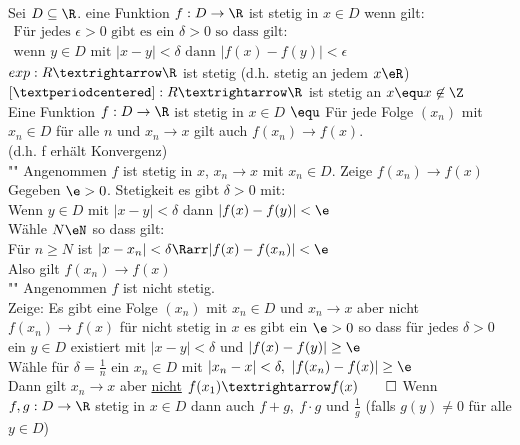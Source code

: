 \wdh
Sei $D \subseteq \R$. eine Funktion $f: D \to \R$ ist stetig in $x \in D$ wenn gilt:\\
$\begin{array}{ll}
\text{Für jedes $\epsilon > 0$ gibt es ein $\delta > 0$ so dass gilt:}\\
\text{wenn $y \in D$ mit $|x - y| < \delta$ dann $|f(x) - f(y)| < \epsilon$}
\end{array}$
\bsp
$exp:R→\R$ ist stetig (d.h. stetig an jedem $x\eR$)\\
$[·]:R→\R$ ist stetig an $x \equ x\not\in\Z$\\
Eine Funktion $f: D \to \R$ ist stetig in $x \in D$ $\equ$ Für jede Folge $(x_n)$ mit $x_n \in D$ für alle $n$ und $x_n \to x$ gilt auch $f(x_n) \to f(x)$.\\
(d.h. f erhält Konvergenz)\\
\bew
"\Rarr" Angenommen $f$ ist stetig in $x$, $x_n→x$ mit $x_n\in D$. Zeige $f(x_n)→f(x)$\\
Gegeben $\e>0$. Stetigkeit \Rarr{} es gibt $\delta>0$ mit:\\
Wenn $y\in D$ mit $|x-y|<\delta$ dann $|f(x)-f(y)|<\e$\\
Wähle $N\eN$ so dass gilt:\\
Für $n\geq N$ ist $|x-x_n|<\delta \Rarr |f(x)-f(x_n)|<\e$\\
Also gilt $f(x_n)→f(x)$\\
"\Larr" Angenommen $f$ ist nicht stetig.\\
Zeige: Es gibt eine Folge $(x_n)$ mit $x_n\in D$ und $x_n→x$ aber nicht $f(x_n)→f(x)$ für nicht stetig in $x$ \Rarr{} es gibt ein $\e>0$ so dass für jedes $\delta>0$ ein $y\in D$ existiert mit $|x-y|<\delta$ und $|f(x)-f(y)|\geq \e$\\
Wähle für $\delta=\frac{1}{n}$ ein $x_n\in D$ mit $|x_n-x|<\delta,\ |f(x_n)-f(x)|\geq\e$\\
Dann gilt $x_n→x$ aber \underline{nicht} $f(x_1)→f(x)\qed$
%
\wdh
{}
Wenn $f, g: D \to \R$ stetig in $x \in D$ dann auch $f + g,\ f \cdot g$ und $\frac{1}{g}$ (falls $g(y) \neq 0$ für alle $y \in D$) \\
